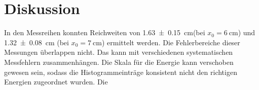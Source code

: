 \section{Diskussion}
In den Messreihen konnten Reichweiten von \qty{1.63 \pm 0.15}{\cm}(bei $x_0 = \qty{6}{\cm}$)  und 
\qty{1.32 \pm 0.08}{\cm} (bei $x_0 = \qty{7}{\cm}$) ermittelt werden.
Die Fehlerbereiche dieser Messungen überlappen nicht.
Das kann mit verschiedenen systematischen Messfehlern zusammenhängen.
Die Skala für die Energie kann verschoben gewesen sein, sodass die Histogrammeinträge
konsistent nicht den richtigen Energien zugeordnet wurden.
Die 